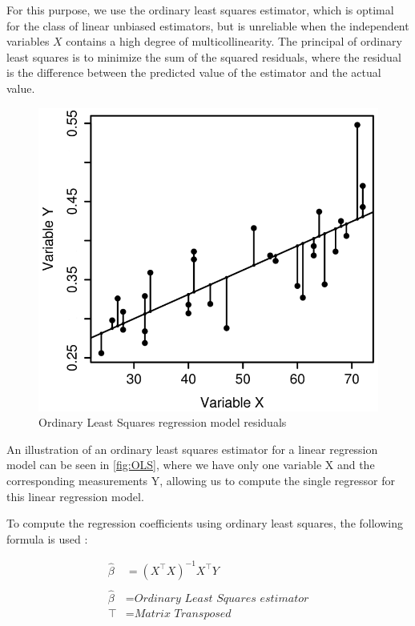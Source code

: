 For this purpose, we use the ordinary least squares estimator, which is optimal for the class of linear unbiased estimators, 
but is unreliable when the independent variables $X$ contains a high degree of multicollinearity.
The principal of ordinary least squares is to minimize the sum of the squared residuals, where the residual is the difference between
the predicted value of the estimator and the actual value. \cite{Linear-Regression}


\begin{figure}[H]
    \centering
    \includegraphics[scale=0.3]{gfx/OLS.png}
    \caption[Ordinary Least Squares regression model residuals]
    {Ordinary Least Squares regression model residuals
    \footnotemark}
    \label{fig:OLS}
\end{figure}

An illustration of an ordinary least squares estimator for a linear regression model can be seen in \autoref{fig:OLS}, where we have only one variable 
X and the corresponding measurements Y, allowing us to compute the single regressor for this linear regression model.

To compute the regression coefficients using ordinary least squares, the following formula is used \cite{Linear-Regression}:

\begin{align}
    \hat{\beta} &=  (\textit{X}^{\top } \textit{X} )^{-1}\textit{X}^{\top} Y \\ \nonumber \\\nonumber
    \hat{\beta} &= \textit{Ordinary Least Squares estimator}\\\nonumber
    \top &= \textit{Matrix Transposed}\nonumber
\end{align}\label{equ:ols}

